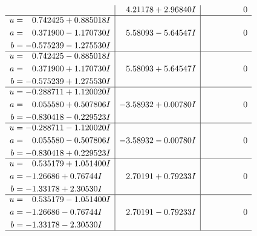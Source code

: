 \documentclass[1p]{elsarticle_modified}
\theoremstyle{definition}
\begin{document}
$$\begin{array}{c|c|c}
 & \phantom{-}4.21178 + 2.96840 I & \phantom{-0.000000 } 0 \\ \hline\begin{aligned}
u &= \phantom{-}0.742425 + 0.885018 I \\
a &= \phantom{-}0.371900 - 1.170730 I \\
b &= -0.575239 - 1.275530 I\end{aligned}
 & \phantom{-}5.58093 - 5.64547 I & \phantom{-0.000000 } 0 \\ \hline\begin{aligned}
u &= \phantom{-}0.742425 - 0.885018 I \\
a &= \phantom{-}0.371900 + 1.170730 I \\
b &= -0.575239 + 1.275530 I\end{aligned}
 & \phantom{-}5.58093 + 5.64547 I & \phantom{-0.000000 } 0 \\ \hline\begin{aligned}
u &= -0.288711 + 1.120020 I \\
a &= \phantom{-}0.055580 + 0.507806 I \\
b &= -0.830418 - 0.229523 I\end{aligned}
 & -3.58932 + 0.00780 I & \phantom{-0.000000 } 0 \\ \hline\begin{aligned}
u &= -0.288711 - 1.120020 I \\
a &= \phantom{-}0.055580 - 0.507806 I \\
b &= -0.830418 + 0.229523 I\end{aligned}
 & -3.58932 - 0.00780 I & \phantom{-0.000000 } 0 \\ \hline\begin{aligned}
u &= \phantom{-}0.535179 + 1.051400 I \\
a &= -1.26686 + 0.76744 I \\
b &= -1.33178 + 2.30530 I\end{aligned}
 & \phantom{-}2.70191 + 0.79233 I & \phantom{-0.000000 } 0 \\ \hline\begin{aligned}
u &= \phantom{-}0.535179 - 1.051400 I \\
a &= -1.26686 - 0.76744 I \\
b &= -1.33178 - 2.30530 I\end{aligned}
 & \phantom{-}2.70191 - 0.79233 I & \phantom{-0.000000 } 0\\
 \hline 
 \end{array}$$\newpage$$\begin{array}{c|c|c}  

\end{array}$$
\end{document}
